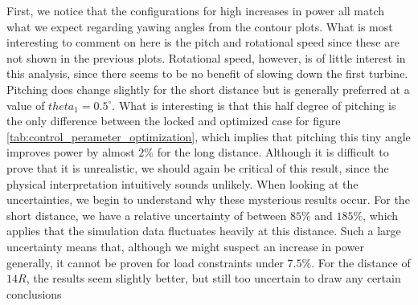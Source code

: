 First, we notice that the configurations for high increases in power all match what we expect regarding yawing angles from the contour plots. What is most interesting to comment on here is the pitch and rotational speed since these are not shown in the previous plots. Rotational speed, however, is of little interest in this analysis, since there seems to be no benefit of slowing down the first turbine. Pitching does change slightly for the short distance but is generally preferred at a value of $theta_1=0.5^\circ$. What is interesting is that this half degree of pitching is the only difference between the locked and optimized case for figure \ref{tab:control_perameter_optimization}, which implies that pitching this tiny angle improves power by almost $2\%$ for the long distance. Although it is difficult to prove that it is unrealistic, we should again be critical of this result, since the physical interpretation intuitively sounds unlikely. When looking at the uncertainties, we begin to understand why these mysterious results occur. For the short distance, we have a relative uncertainty of between $85\%$ and $185\%$, which applies that the simulation data fluctuates heavily at this distance. Such a large uncertainty means that, although we might suspect an increase in power generally, it cannot be proven for load constraints under $7.5\%$. For the distance of $14R$, the results seem slightly better, but still too uncertain to draw any certain conclusions 